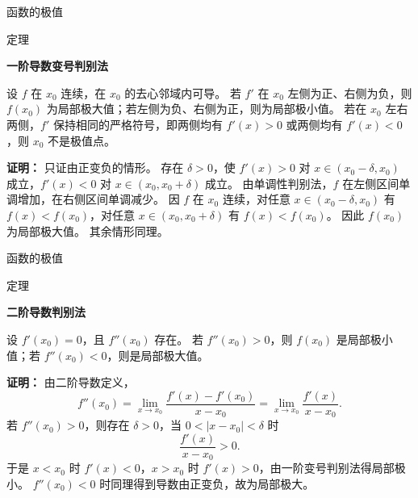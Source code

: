 \documentclass[aspectratio=169,10pt,fontset=fandol]{ctexbeamer}
\begin{document}
\begin{frame}[t,fragile]{函数的极值}
\normalsize
\begin{block}{定理}
{\normalsize
\textbf{一阶导数变号判别法}\par

设 $f$ 在 $x_0$ 连续，在 $x_0$ 的去心邻域内可导。 若 $f'$ 在 $x_0$ 左侧为正、右侧为负，则 $f(x_0)$ 为局部极大值；若左侧为负、右侧为正，则为局部极小值。 若在 $x_0$ 左右两侧，$f'$ 保持相同的严格符号，即两侧均有 $f'(x)>0$ 或两侧均有 $f'(x)<0$，则 $x_0$ 不是极值点。

}
\end{block}
\pause
{\normalsize
\textbf{证明：}
只证由正变负的情形。 存在 $\delta>0$，使 $f'(x)>0$ 对 $x\in(x_0-\delta,x_0)$ 成立，$f'(x)<0$ 对 $x\in(x_0,x_0+\delta)$ 成立。 由单调性判别法，$f$ 在左侧区间单调增加，在右侧区间单调减少。 因 $f$ 在 $x_0$ 连续，对任意 $x\in(x_0-\delta,x_0)$ 有 $f(x)<f(x_0)$，对任意 $x\in(x_0,x_0+\delta)$ 有 $f(x)<f(x_0)$。 因此 $f(x_0)$ 为局部极大值。 其余情形同理。

}
\end{frame}
\begin{frame}[t,fragile]{函数的极值}
\small
\begin{block}{定理}
{\small
\textbf{二阶导数判别法}\par

设 $f'(x_0)=0$，且 $f''(x_0)$ 存在。 若 $f''(x_0)>0$，则 $f(x_0)$ 是局部极小值；若 $f''(x_0)<0$，则是局部极大值。

}
\end{block}
\pause
{\small
\textbf{证明：}
由二阶导数定义，
\[
f''(x_0)=\lim_{x\to x_0}\frac{f'(x)-f'(x_0)}{x-x_0}
=\lim_{x\to x_0}\frac{f'(x)}{x-x_0}.
\]
若 $f''(x_0)>0$，则存在 $\delta>0$，当 $0<|x-x_0|<\delta$ 时
\[
\frac{f'(x)}{x-x_0}>0.
\]
于是 $x<x_0$ 时 $f'(x)<0$，$x>x_0$ 时 $f'(x)>0$，由一阶变号判别法得局部极小。 $f''(x_0)<0$ 时同理得到导数由正变负，故为局部极大。

}
\end{frame}
\end{document}
